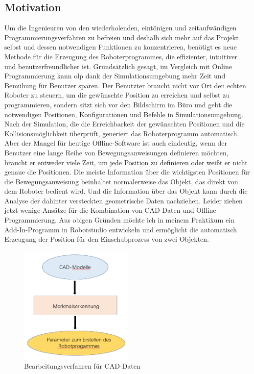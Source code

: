 \documentclass[14pt,a4paper,titlepage]{article}
\begin{document}
	\subsection{Motivation}
		Um die Ingenieuren von den wiederholenden, eintönigen und zeitaufwändigen Programmierungsverfahren zu befreien und deshalb sich mehr auf das Projekt selbst und dessen notwendigen Funktionen zu konzentrieren, benötigt es neue Methode für die Erzeugung des Roboterprogrammes, die effizienter, intuitiver und benutzerfreundlicher ist. 
		\bigbreak
		Grundsätzlich gesagt, im Vergleich mit Online Programmierung kann \acs{olp} dank der Simulationsumgebung mehr Zeit und Bemühung für Benutzer sparen. Der Benutzter braucht nicht vor Ort den echten Roboter zu steuern, um die gewünschte Position zu erreichen und selbst zu programmieren, sondern sitzt sich vor den Bildschirm im Büro und gebt die notwendigen Positionen, Konfigurationen und Befehle in Simulationsumgebung. Nach der Simulation, die die Erreichbarkeit der gewünschten Positionen und die Kollisionsmöglichkeit überprüft, generiert das Roboterprogramm automatisch. Aber der Mangel für heutige Offline-Software ist auch eindeutig, wenn der Benutzer eine lange Reihe von Bewegungsanweisungen definieren möchten, braucht er entweder viele Zeit, um jede Position zu definieren oder weißt er nicht genaue die Positionen. 
		\bigbreak
		Die meiste Information über die wichtigsten Positionen für die Bewegungsanweisung beinhaltet normalerweise das Objekt, das direkt von dem Roboter bedient wird. Und die Information über das Objekt kann durch die Analyse der dahinter versteckten geometrische Daten nachziehen. Leider ziehen jetzt wenige Ansätze für die Kombination von CAD-Daten und Offline Programmierung.
		\bigbreak
		Aus obigen Gründen möchte ich in meinem Praktikum ein Add-In-Programm in Robotstudio entwickeln und ermöglicht die automatisch Erzeugung der Position für den Einschubprozess von zwei Objekten. 
		\begin{figure}[h!]
			\centering
			\includegraphics[width=0.5\textwidth]{Bearbeitungsverfahren.png}
			\caption{Bearbeitungsverfahren für CAD-Daten}
			\label{fig1}
		\end{figure}
\end{document}
